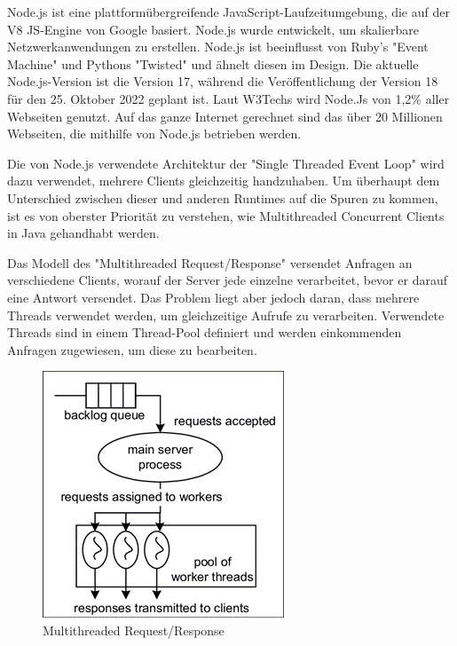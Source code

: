 Node.js ist eine plattformübergreifende JavaScript-Laufzeitumgebung, die auf der V8 JS-Engine von Google basiert. Node.js wurde entwickelt, um skalierbare Netzwerkanwendungen zu erstellen. Node.js ist beeinflusst von Ruby's "Event Machine" und Pythons "Twisted" und ähnelt diesen im Design. Die aktuelle Node.js-Version ist die Version 17, während die Veröffentlichung der Version 18 für den 25. Oktober 2022 geplant ist. Laut W3Techs wird Node.Js von 1,2\% aller Webseiten genutzt. Auf das ganze Internet gerechnet sind das über 20 Millionen Webseiten, die mithilfe von Node.js betrieben werden. \cite{Node}

Die von Node.js verwendete Architektur der "Single Threaded Event Loop" wird dazu verwendet, mehrere Clients gleichzeitig handzuhaben. Um überhaupt dem Unterschied zwischen dieser und anderen Runtimes auf die Spuren zu kommen, ist es von oberster Priorität zu verstehen, wie Multithreaded Concurrent Clients in Java gehandhabt werden. \cite{NodeJs.dev}


Das Modell des "Multithreaded Request/Response" versendet Anfragen an verschiedene Clients, worauf der Server jede einzelne verarbeitet, bevor er darauf eine Antwort versendet. Das Problem liegt aber jedoch daran, dass mehrere Threads verwendet werden, um gleichzeitige Aufrufe zu verarbeiten. Verwendete Threads sind in einem Thread-Pool definiert und werden einkommenden Anfragen zugewiesen, um diese zu bearbeiten. \cite{Arocom}



\begin{figure}[H]
    \centering
    \includegraphics{media/NodeJs/MultiThreadedRequestResponse.png}
    \caption{Multithreaded Request/Response\cite{Multithreaded}}
\end{figure}

